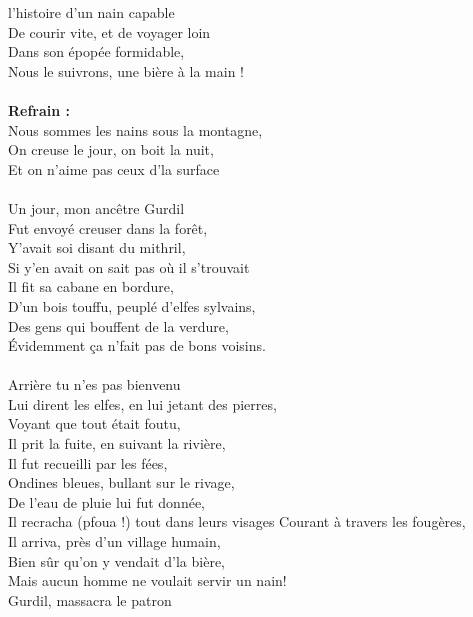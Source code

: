 
 l'histoire d'un nain capable
\\De courir vite, et de voyager loin
\\Dans son épopée formidable,
\\Nous le suivrons, une bière à la main !
\\\\\textbf{Refrain :}
\\Nous sommes les nains sous la montagne,
\\On creuse le jour, on boit la nuit,
\\Et on n'aime pas ceux d'la surface
\\\\Un jour, mon ancêtre Gurdil 
\\Fut envoyé creuser dans la forêt,
\\Y'avait soi disant du mithril,
\\Si y'en avait on sait pas où il s'trouvait
\\Il fit sa cabane en bordure,
\\D'un bois touffu, peuplé d'elfes sylvains,
\\Des gens qui bouffent de la verdure,
\\Évidemment ça n'fait pas de bons voisins.
\\\\Arrière tu n'es pas bienvenu
\\Lui dirent les elfes, en lui jetant des pierres,
\\Voyant que tout était foutu,
\\Il prit la fuite, en suivant la rivière,
\\Il fut recueilli par les fées,
\\Ondines bleues, bullant sur le rivage,
\\De l'eau de pluie lui fut donnée,
\\Il recracha (pfoua !) tout dans leurs visages
\breakpage
Courant à travers les fougères,
\\Il arriva, près d'un village humain,
\\Bien sûr qu'on y vendait d'la bière,
\\Mais aucun homme ne voulait servir un nain!
\\Gurdil, massacra le patron
